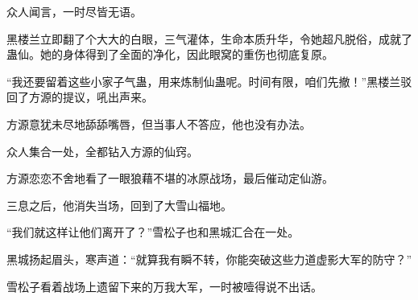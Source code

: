 \begin{this_body}
众人闻言，一时尽皆无语。

黑楼兰立即翻了个大大的白眼，三气灌体，生命本质升华，令她超凡脱俗，成就了蛊仙。她的身体得到了全面的净化，因此眼窝的重伤也彻底复原。

“我还要留着这些小家子气蛊，用来炼制仙蛊呢。时间有限，咱们先撤！”黑楼兰驳回了方源的提议，吼出声来。

方源意犹未尽地舔舔嘴唇，但当事人不答应，他也没有办法。

众人集合一处，全都钻入方源的仙窍。

方源恋恋不舍地看了一眼狼藉不堪的冰原战场，最后催动定仙游。

三息之后，他消失当场，回到了大雪山福地。

“我们就这样让他们离开了？”雪松子也和黑城汇合在一处。

黑城扬起眉头，寒声道：“就算我有瞬不转，你能突破这些力道虚影大军的防守？”

雪松子看着战场上遗留下来的万我大军，一时被噎得说不出话。

\end{this_body}

